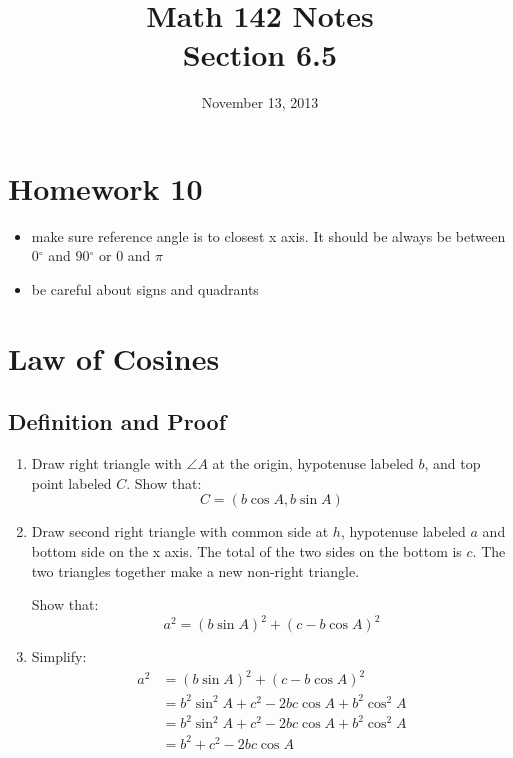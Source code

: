 \documentclass{exam}
\title{Math 142 Notes \\ Section 6.5}
\date{November 13, 2013}
\newcommand{\dg}{\ensuremath{^\circ}}
\begin{document}
  \maketitle
  \tableofcontents

  \section{Homework 10}
  \begin{itemize}
    \item make sure reference angle is to closest x axis.  It should be always be between $0 \dg$ and $90 \dg$ or
      $0$ and $\pi$

    \item be careful about signs and quadrants
  \end{itemize}

  \section{Law of Cosines}

  \subsection{Definition and Proof}
  \begin{enumerate}
    \item Draw right triangle with $\angle A$ at the origin, hypotenuse labeled $b$, and top point labeled $C$.  Show that:
      \[
        C = (b \cos A, b \sin A)
      \]

    \item Draw second right triangle with common side at $h$, hypotenuse labeled $a$ and bottom side on the x axis.  The
      total of the two sides on the bottom is $c$.  The two triangles together make a new non-right triangle. 
      
      Show that:
      \[
        a^2 = \left( b \sin A \right)^2 + \left( c - b \cos A \right)^2 
      \]

    \item Simplify:
      \begin{align*}
        a^2 & = \left( b \sin A \right)^2 + \left( c - b \cos A \right)^2  \\
            & = b^2 \sin^2 A + c^2 - 2bc \cos A  + b^2 \cos^2 A \\
            & = b^2 \sin^2 A + c^2 - 2bc \cos A  + b^2 \cos^2 A \\
            & = b^2 + c^2 - 2bc \cos A \\
      \end{align*}

  \end{enumerate}
  
\end{document}
